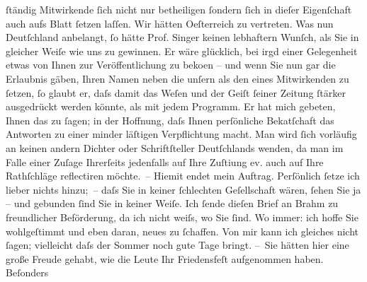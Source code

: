 \begin{ledgroupsized}[t]{13cm}
                    ſtändig Mitwirkende ſich nicht nur betheiligen ſondern ſich in dieſer
                    Eigenſchaft auch aufs Blatt ſetzen laſſen. Wir hätten Oeſterreich zu vertreten. Was nun Deutſchland anbelangt, ſo hätte Prof. Singer keinen lebhaftern Wunſch, als Sie {\pb}in gleicher Weiſe wie uns zu gewinnen. Er wäre glücklich,
                    bei irgd einer Gelegenheit etwas von Ihnen zur Veröffentlichung zu beko{\geminationm}en – und wenn Sie nun gar die Erlaubnis gäben,
                    Ihren Namen neben die unſern als den eines Mitwirkenden zu ſetzen, ſo glaubt er,
                    daſs damit das Weſen und der Geiſt ſeiner Zeitung ſtärker {\pb}ausgedrückt werden könnte, als mit jedem Programm. Er hat mich gebeten, Ihnen
                    das zu ſagen; in der Hoffnung, daſs Ihnen perſönliche Beka{\geminationn}tſchaft das Antworten zu einer minder läſtigen
                    Verpflichtung macht. Man wird ſich vorläufig an keinen andern Dichter oder
                    Schriftſteller Deutſch{\pb}lands wenden, da man im Falle einer Zuſage Ihrerſeits jedenfalls auf Ihre
                        Zuſti{\geminationm}ung ev. auch auf Ihre Rathſchläge
                    reflectiren möchte. –\pend
           \pstart
           Hiemit endet mein Auftrag. Perſönlich ſetze ich lieber nichts hinzu; – daſs Sie
                    in keiner ſchlechten Geſellschaft wären, ſehen Sie ja – und gebunden ſind {\pb}Sie in keiner Weiſe.\pend
           \pstart
           Ich ſende dieſen Brief an Brahm zu
                    freundlicher Beförderung, da ich nicht weiſs, wo Sie ſind. Wo immer: ich hoffe
                    Sie wohlgeſtimmt und eben daran, neues zu ſchaffen.\pend
           \pstart
           Von mir kann ich gleiches nicht ſagen; vielleicht daſs der Sommer noch gute Tage
                        bringt.\pend
           \pstart
           {\pb}– Sie hätten hier eine große Freude gehabt, wie die Leute
                    Ihr Friedensfeſt aufgenommen haben. Beſonders

\end{ledgroupsized}
